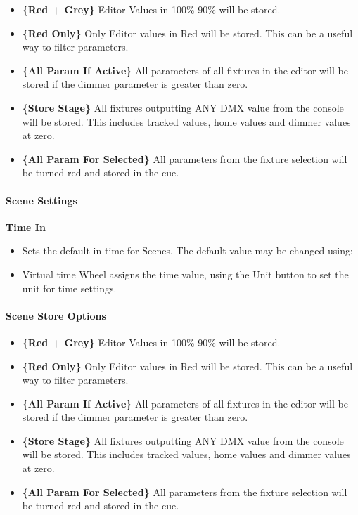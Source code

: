 \documentclass[
]{article}
\begin{document}
\begin{itemize}
\item
  \textbf{\{Red + Grey\}} Editor Values in 100\% 90\% will be stored.
\item
  \textbf{\{Red Only\}} Only Editor values in Red will be stored. This can be a useful way to filter parameters.
\item
  \textbf{\{All Param If Active\}} All parameters of all fixtures in the editor will be stored if the dimmer parameter is greater than zero.
\item
  \textbf{\{Store Stage\}} All fixtures outputting ANY DMX value from the console will be stored. This includes tracked values, home values and dimmer values at zero.
\item
  \textbf{\{All Param For Selected\}} All parameters from the fixture selection will be turned red and stored in the cue.
\end{itemize}

\hypertarget{scene-settings}{%
\paragraph{Scene Settings}\label{scene-settings}}

\textbf{Time In}

\begin{itemize}
\item
  Sets the default in-time for Scenes. The default value may be changed using:
\item
  Virtual time Wheel assigns the time value, using the Unit button to set the unit for time settings.
\end{itemize}

\hypertarget{scene-store-options}{%
\paragraph{Scene Store Options}\label{scene-store-options}}

\begin{itemize}
\item
  \textbf{\{Red + Grey\}} Editor Values in 100\% 90\% will be stored.
\item
  \textbf{\{Red Only\}} Only Editor values in Red will be stored. This can be a useful way to filter parameters.
\item
  \textbf{\{All Param If Active\}} All parameters of all fixtures in the editor will be stored if the dimmer parameter is greater than zero.
\item
  \textbf{\{Store Stage\}} All fixtures outputting ANY DMX value from the console will be stored. This includes tracked values, home values and dimmer values at zero.
\item
  \textbf{\{All Param For Selected\}} All parameters from the fixture selection will be turned red and stored in the cue.
\end{itemize}
\end{document}
